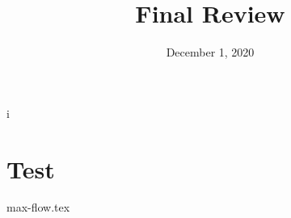 i\documentclass[11pt]{exam}
\title{Final Review}
\date{December 1, 2020}
\begin{document}
\maketitle


\section{Test}
\begin{questions}
{max-flow.tex}

\end{questions}


\end{document}
